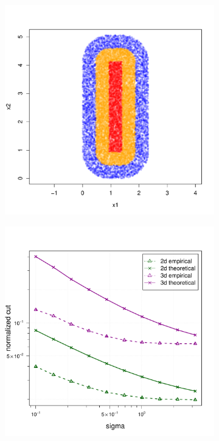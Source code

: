 \documentclass{article}
\newcommand{\1}{\mathbf{1}}
\theoremstyle{aldenthm}
\theoremstyle{aldenrmrk}
\begin{document}
\begin{figure}
\begin{adjustbox}{minipage=\linewidth,scale=0.8}
\begin{subfigure}{.33\linewidth}
			\includegraphics[width=\linewidth]{example1plots/sample1}
			\caption{}
		\end{subfigure}
		\begin{subfigure}{.33\linewidth}
			\includegraphics[width=\linewidth]{example1plots/sigma_normalized_cut_plot}
			\caption{}
		\end{subfigure}
		

\end{adjustbox}
\end{figure}
\end{document}
